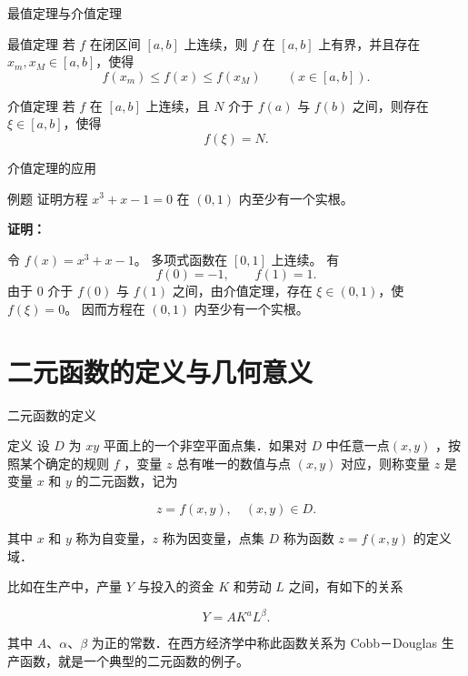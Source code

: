\documentclass[aspectratio=169,10pt]{ctexbeamer}
\begin{document}
\begin{frame}{最值定理与介值定理}
	
	
	\begin{block}{最值定理}
		若 $f$ 在闭区间 $[a,b]$ 上连续，则 $f$ 在 $[a,b]$ 上有界，并且存在 $x_m,x_M\in[a,b]$，使得
		\[
		f(x_m)\le f(x)\le f(x_M)\qquad (x\in[a,b]).
		\]
	\end{block}
	
	\vspace{0.3cm}
	
	\begin{block}{介值定理}
		若 $f$ 在 $[a,b]$ 上连续，且 $N$ 介于 $f(a)$ 与 $f(b)$ 之间，则存在 $\xi\in[a,b]$，使得
		\[
		f(\xi)=N.
		\]
	\end{block}

	
	
\end{frame}



\begin{frame}{介值定理的应用}
	\begin{block}{例题}
		证明方程 $x^3+x-1=0$ 在 $(0,1)$ 内至少有一个实根。
	\end{block}
	
	\pause
	
	\vspace{0.4cm}
	
	\textbf{证明：}
	
	令 $f(x)=x^3+x-1$。 多项式函数在 $[0,1]$ 上连续。 有
	\[
	f(0)=-1,\qquad f(1)=1.
	\]
	由于 $0$ 介于 $f(0)$ 与 $f(1)$ 之间，由介值定理，存在 $\xi\in(0,1)$，使 $f(\xi)=0$。 因而方程在 $(0,1)$ 内至少有一个实根。
\end{frame}

\section{二元函数的定义与几何意义}

\begin{frame}{二元函数的定义}
	
	\begin{block}{定义}
		设 $D$ 为 $x y$ 平面上的一个非空平面点集．如果对 $D$ 中任意一点$(x, y)$ ，按照某个确定的规则 $f$ ，变量 $z$ 总有唯一的数值与点 $(x, y)$ 对应，则称变量 $z$ 是变量 $x$ 和 $y$ 的二元函数，记为
		
		$$
		z=f(x, y), \quad(x, y) \in D .
		$$
		
		其中 $x$ 和 $y$ 称为自变量，$z$ 称为因变量，点集 $D$ 称为函数 $z=f(x, y)$ 的定义域．
	\end{block}
	
	\pause
	
	比如在生产中，产量 $Y$ 与投入的资金 $K$ 和劳动 $L$ 之间，有如下的关系
	
	$$
	Y=A K^a L^\beta .
	$$
	
	其中 $A 、 \alpha 、 \beta$ 为正的常数．在西方经济学中称此函数关系为 Cobb－Douglas 生产函数，就是一个典型的二元函数的例子。
	
	
\end{frame}
\end{document}
